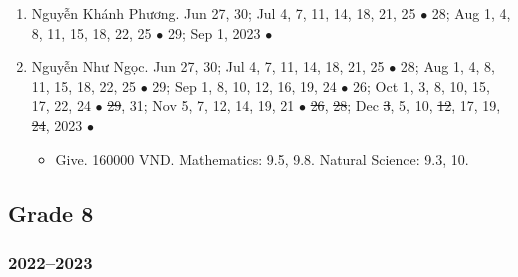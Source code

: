 \documentclass{article}
\begin{document}
\begin{enumerate}
\begin{itemize}
	\end{itemize}
	\item {\sc Nguyễn Khánh Phương.} {\sf[In]} Jun 27, 30; Jul 4, 7, 11, 14, 18, 21, 25 $\bullet$ 28; Aug 1, 4, 8, 11, 15, 18, 22, 25 $\bullet$ 29; Sep 1, 2023 $\bullet$ \sf{[Out]}
	\item {\sc Nguyễn Như Ngọc.} {\sf[In]} Jun 27, 30; Jul 4, 7, 11, 14, 18, 21, 25 $\bullet$ 28; Aug 1, 4, 8, 11, 15, 18, 22, 25 $\bullet$ 29; Sep 1, 8, 10, 12, 16, 19, 24 $\bullet$ 26; Oct 1, 3, 8, 10, 15, 17, 22, 24 $\bullet$ \st{29}, 31; Nov 5, 7, 12, 14, 19, 21 $\bullet$ \st{26}, \st{28}; Dec \st{3}, 5, 10, \st{12}, 17, 19, \st{24}, 2023 $\bullet$ {\sf[Out]}
	\begin{itemize}
		\item {\sf Give.} 160000 VND. Mathematics: 9.5, 9.8. Natural Science: 9.3, 10.
	\end{itemize}
\end{enumerate}


\subsection{Grade 8}

\subsubsection{2022--2023}
\end{document}
